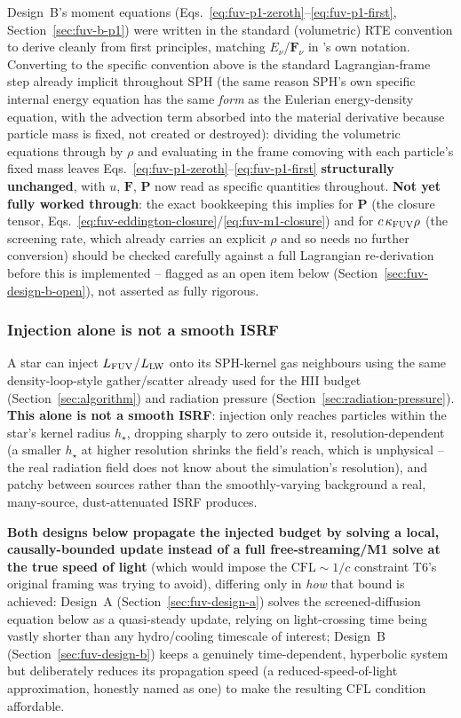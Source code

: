 Design~B's moment equations (Eqs.~\ref{eq:fuv-p1-zeroth}--\ref{eq:fuv-p1-first},
Section~\ref{sec:fuv-b-p1}) were written in the standard (volumetric)
RTE convention to derive cleanly from first principles, matching
$E_\nu$/$\mathbf F_\nu$ in 's own notation. Converting to
the specific convention above is the standard Lagrangian-frame step
already implicit throughout SPH (the same reason SPH's own specific
internal energy equation has the same \emph{form} as the Eulerian
energy-density equation, with the advection term absorbed into the
material derivative because particle mass is fixed, not created or
destroyed): dividing the volumetric equations through by $\rho$ and
evaluating in the frame comoving with each particle's fixed mass leaves
Eqs.~\ref{eq:fuv-p1-zeroth}--\ref{eq:fuv-p1-first} \textbf{structurally
unchanged}, with $u$, $\mathbf F$, $\mathbf P$ now read as specific
quantities throughout. \textbf{Not yet fully worked through}: the exact
bookkeeping this implies for $\mathbf P$ (the closure tensor,
Eqs.~\ref{eq:fuv-eddington-closure}/\ref{eq:fuv-m1-closure}) and for
$c\,\kappa_{\rm FUV}\rho$ (the screening rate, which already carries an
explicit $\rho$ and so needs no further conversion) should be checked
carefully against a full Lagrangian re-derivation before this is
implemented -- flagged as an open item below
(Section~\ref{sec:fuv-design-b-open}), not asserted as fully rigorous.

\subsubsection{Injection alone is not a smooth ISRF}
\label{sec:fuv-propagation}

A star can inject $L_{\rm FUV}$/$L_{\rm LW}$ onto its SPH-kernel gas
neighbours using the same density-loop-style gather/scatter already
used for the HII budget (Section~\ref{sec:algorithm}) and radiation
pressure (Section~\ref{sec:radiation-pressure}). \textbf{This alone is
not a smooth ISRF}: injection only reaches particles within the
star's kernel radius $h_\star$, dropping sharply to zero outside it,
resolution-dependent (a smaller $h_\star$ at higher resolution shrinks
the field's reach, which is unphysical -- the real radiation field
does not know about the simulation's resolution), and patchy between
sources rather than the smoothly-varying background a real,
many-source, dust-attenuated ISRF produces.

\textbf{Both designs below propagate the injected budget by solving a
local, causally-bounded update instead of a full free-streaming/M1
solve at the true speed of light} (which would impose the
$\text{CFL}\sim1/c$ constraint T6's original framing was trying to
avoid), differing only in \emph{how} that bound is achieved: Design~A
(Section~\ref{sec:fuv-design-a}) solves the screened-diffusion equation
below as a quasi-steady update, relying on light-crossing time being
vastly shorter than any hydro/cooling timescale of interest; Design~B
(Section~\ref{sec:fuv-design-b}) keeps a genuinely time-dependent,
hyperbolic system but deliberately reduces its propagation speed
(a reduced-speed-of-light approximation, honestly named as one) to make
the resulting CFL condition affordable.

